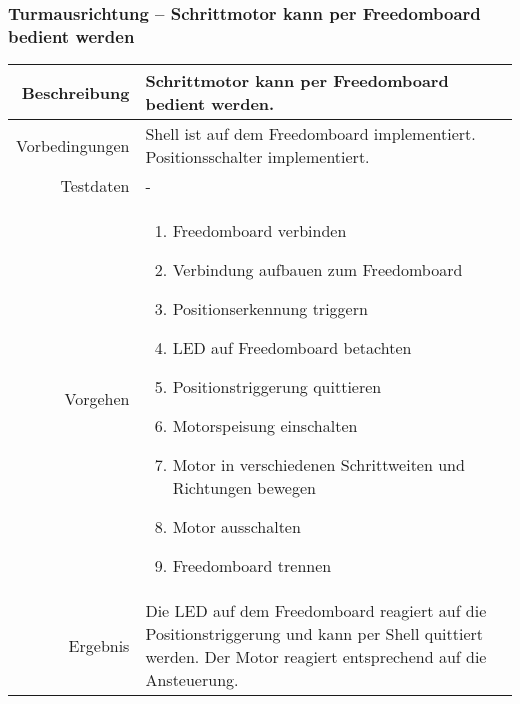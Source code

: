 \newpage
\subsubsection{Turmausrichtung -- Schrittmotor kann per Freedomboard bedient werden}
\begin{table}[h!]
	\renewcommand{\arraystretch}{1.5}
	\begin{tabular}{|r|p{14cm}|}
		\hline Beschreibung	&
			Schrittmotor kann per Freedomboard bedient werden. \\ 
		\hline Vorbedingungen	&
			Shell ist auf dem Freedomboard implementiert.
			Positionsschalter implementiert. \\ 
		\hline Testdaten	& - \\ 
		\hline Vorgehen		& 
		\begin{enumerate}
			\item Freedomboard verbinden
			\item Verbindung aufbauen zum Freedomboard
			\item Positionserkennung triggern
			\item LED auf Freedomboard betachten
			\item Positionstriggerung quittieren
			\item Motorspeisung einschalten
			\item Motor in verschiedenen Schrittweiten und Richtungen bewegen
			\item Motor ausschalten
			\item Freedomboard trennen
		\end{enumerate} \\ 
		\hline Ergebnis 	&
			Die LED auf dem Freedomboard reagiert auf die
			Positionstriggerung und kann per Shell quittiert werden.
			Der Motor reagiert entsprechend auf die Ansteuerung. \\ 
		\hline 
	\end{tabular}
\end{table}

